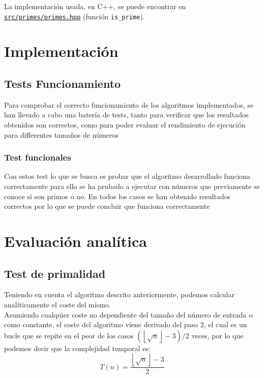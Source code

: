 La implementación usada, en C++, se puede encontrar en \href{run:./src/primes/primes.hpp}{\texttt{src/primes/primes.hpp}} (función \texttt{is\_prime}).

\section{Implementación}
\subsection{Tests Funcionamiento }
Para comprobar el correcto funcionamiento de los algoritmos implementados, se han llevado a cabo una batería de tests, tanto para verificar que los resultados obtenidos son correctos, como para poder evaluar el rendimiento de ejecución para differentes tamaños de números


\subsubsection{Test funcionales}

Con estos test lo que se busca es probar que el algoritmo desarrollado funciona correctamente para ello se ha prubado a ejecutar con números que previamente se conoce si son primos o no. En todos los casos se han obtenido resultados correctos por lo que se puede concluir que funciona correctamente
\begin{figure}[H]
\end{figure}
  

\section{Evaluación analítica}
\subsection{Test de primalidad}

Teniendo en cuenta el algoritmo descrito anteriormente, podemos calcular analíticamente el coste del mismo.\\
Asumiendo cualquier coste no dependiente del tamaño del número de entrada $n$ como constante, el coste del algoritmo viene derivado del paso 2, el cual es un bucle que se repite en el peor de los casos $(\left \lfloor \sqrt{n} \right \rfloor - 3)/2$ veces, por lo que podemos decir que la complejidad temporal es:
\begin{equation}
    T(n) = \frac{\left \lfloor \sqrt{n} \right \rfloor - 3}{2}
\end{equation}

